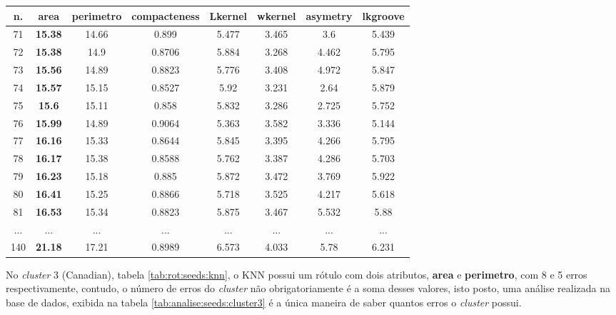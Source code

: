 \begin{table}[!ht]
{\begin{tabular}{|c|c|c|c|c|c|c|c|}
n. & \textbf{area} & \textbf{perimetro} & compacteness & Lkernel & wkernel & asymetry &lkgroove \\ \hline
\rowcolor[HTML]{EFEFEF} 
71 & \textbf{15.38} & 14.66 & 0.899 & 5.477 & 3.465 & 3.6 & 5.439\\ \hline 
\rowcolor[HTML]{EFEFEF}
72 & \textbf{15.38} & 14.9 & 0.8706 & 5.884 & 3.268 & 4.462 & 5.795\\ \hline 
\rowcolor[HTML]{EFEFEF}
73 & \textbf{15.56} & 14.89 & 0.8823 & 5.776 & 3.408 & 4.972 & 5.847\\ \hline 
\rowcolor[HTML]{EFEFEF}
74 & \textbf{15.57} & 15.15 & 0.8527 & 5.92 & 3.231 & 2.64 & 5.879\\ \hline 
\rowcolor[HTML]{EFEFEF}
75 & \textbf{15.6} & 15.11 & 0.858 & 5.832 & 3.286 & 2.725 & 5.752\\ \hline 
\rowcolor[HTML]{EFEFEF}
76 & \textbf{15.99} & 14.89 & 0.9064 & 5.363 & 3.582 & 3.336 & 5.144\\ \hline 
77 & \textbf{16.16} & 15.33 & 0.8644 & 5.845 & 3.395 & 4.266 & 5.795\\ \hline 
78 & \textbf{16.17} & 15.38 & 0.8588 & 5.762 & 3.387 & 4.286 & 5.703\\ \hline 
\rowcolor[HTML]{EFEFEF}
79 & \textbf{16.23} & 15.18 & 0.885 & 5.872 & 3.472 & 3.769 & 5.922\\ \hline 
80 & \textbf{16.41} & 15.25 & 0.8866 & 5.718 & 3.525 & 4.217 & 5.618\\ \hline 
81 & \textbf{16.53} & 15.34 & 0.8823 & 5.875 & 3.467 & 5.532 & 5.88\\ \hline 
...& ... & ... & ... & ... & ... & ... & ...\\ \hline 
140 & \textbf{21.18} & 17.21 & 0.8989 & 6.573 & 4.033 & 5.78 & 6.231\\ \hline 

\end{tabular}
    }
    
 \label{tab:analise:seeds:cluster2}
\end{table}

No \textit{cluster} 3 (Canadian), tabela \ref{tab:rot:seeds:knn}, o KNN possui um rótulo com dois atributos, \textbf{area} e \textbf{perimetro}, com 8 e 5 erros respectivamente, contudo, o número de erros do \textit{cluster} não obrigatoriamente é a soma desses valores, isto posto, uma análise realizada na base de dados, exibida na tabela \ref{tab:analise:seeds:cluster3} é a  única maneira de saber quantos erros o \textit{cluster} possui. 


